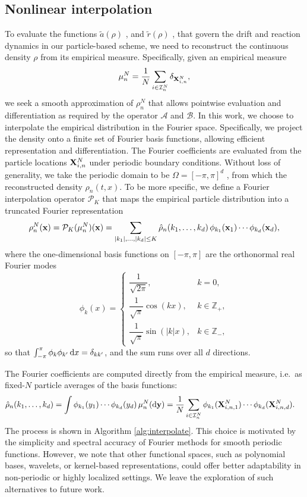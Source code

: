 \documentclass[a4paper,fleqn]{cas-sc}
\theoremstyle{definition}
\theoremstyle{remark}
\begin{document}
\subsection{Nonlinear interpolation}
\label{sec:interpolation}
To evaluate the functions $\tilde a(\rho)$ , and $\tilde r(\rho)$ , that govern the drift and reaction dynamics in our particle-based scheme, we need to reconstruct the continuous density 
$\rho$ from its empirical measure. Specifically, given an empirical measure
\[
\mu^N_n= \frac{1}{N}\sum_{i\in \mathcal I^N_n}\delta_{\mathbf{X}_{i,n}^N},
\] 
we seek a smooth approximation of $\rho^N_n$ that allows pointwise evaluation and differentiation as required by the operator $\mathcal{A}$ and $\mathcal{B}$.
In this work, we choose to interpolate the empirical distribution in the Fourier space. Specifically, we project the density onto a finite set of Fourier basis functions, allowing efficient representation and differentiation. 
The Fourier coefficients are evaluated from the particle locations $\mathbf{X}^N_{i,n}$ under periodic boundary conditions. Without loss of generality, we take the periodic domain to be $\Omega=[-\pi,\pi]^d$ , from which the reconstructed density $\rho_n(t,x)$. To be more specific, we define a Fourier interpolation operator $\mathcal P_K$
that maps the empirical particle distribution into a truncated Fourier representation 
\[
\rho^N_n(\mathbf{x}) = \mathcal{P}_K(\mu^N_n)(\mathbf{x}) 
          = \sum_{\vert k_1\vert ,\dots,\vert k_d\vert \leq K} \hat{\rho}_n(k_1,\dots,k_d)\,\phi_{k_1}(\mathbf{x}_1)\cdots\phi_{k_d}(\mathbf{x}_d),
\]
where the one-dimensional basis functions on $[-\pi,\pi]$ are the orthonormal real Fourier modes
\[
\phi_k(x) =
\begin{cases}
\dfrac{1}{\sqrt{2\pi}}, & k=0, \\[4pt]
\dfrac{1}{\sqrt{\pi}} \cos(k  x), & k \in \mathbb{Z}_+, \\[4pt]
\dfrac{1}{\sqrt{\pi}}\sin(|k|  x), & k \in \mathbb{Z}_- ,
\end{cases}
\]
so that $\int_{-\pi}^{\pi}\phi_k\phi_{k'}\,\mathrm{d} x=\delta_{kk'}$, and the sum runs over all $d$ directions.

The Fourier coefficients are computed directly from the empirical measure, i.e.\ as fixed-$N$ particle averages
of the basis functions:
\begin{equation}
\begin{aligned}
    \hat{\rho}_n(k_1,\dots,k_d) &= \int \phi_{k_1}(y_1)\cdots \phi_{k_d}(y_d)\,\mu^N_n(\mathrm{d}\mathbf{y})
    = \frac{1}{N}\sum_{i\in \mathcal I^N_n} \phi_{k_1}(\mathbf{X}_{i,n,1}^{N})\cdots \phi_{k_d}(\mathbf{X}_{i,n,d}^{N}).
\end{aligned}
\label{eq:Fourier_mode}
\end{equation}
The process is shown in Algorithm \ref{alg:interpolate}. 
This choice is motivated by the simplicity and spectral accuracy of Fourier methods for smooth periodic functions. However, we note that other functional spaces, such as polynomial bases, wavelets, or kernel-based representations, could offer better adaptability in non-periodic or highly localized settings. We leave the exploration of such alternatives to future work.
\end{document}
